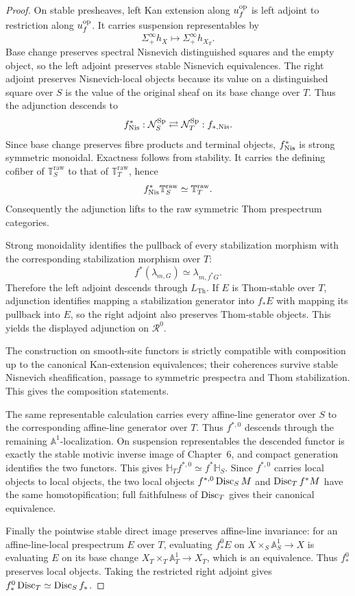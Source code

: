 \begin{proof}
On stable presheaves, left Kan extension along \(u_f^{\mathrm{op}}\) is left adjoint to
restriction along \(u_f^{\mathrm{op}}\).  It carries suspension representables by
\[
  \Sigma^\infty_+h_X
  \longmapsto
  \Sigma^\infty_+h_{X_T}.
\]
Base change preserves spectral Nisnevich distinguished squares and the empty
object, so the left adjoint preserves stable Nisnevich equivalences.  The right
adjoint preserves Nisnevich-local objects because its value on a distinguished
square over \(S\) is the value of the original sheaf on its base change over
\(T\).  Thus the adjunction descends to
\[
  f^*_{\mathrm{Nis}}:\mathcal N_S^{\mathrm{Sp}}
  \rightleftarrows
  \mathcal N_T^{\mathrm{Sp}}:f_{*,\mathrm{Nis}}.
\]
Since base change preserves fibre products and terminal objects,
\(f^*_{\mathrm{Nis}}\) is strong symmetric monoidal.  Exactness follows from stability.
It carries the defining cofiber of \(\mathbb T_S^{\mathrm{raw}}\) to that of
\(\mathbb T_T^{\mathrm{raw}}\), hence
\[
  f^*_{\mathrm{Nis}}\mathbb T_S^{\mathrm{raw}}
  \simeq
  \mathbb T_T^{\mathrm{raw}}.
\]
Consequently the adjunction lifts to the raw symmetric Thom prespectrum
categories.

Strong monoidality identifies the pullback of every stabilization morphism with
the corresponding stabilization morphism over \(T\):
\[
  f^*(\lambda_{m,G})
  \simeq
  \lambda_{m,f^*G}.
\]
Therefore the left adjoint descends through \(L_{\mathrm{Th}}\).  If \(E\) is
Thom-stable over \(T\), adjunction identifies mapping a stabilization generator
into \(f_*E\) with mapping its pullback into \(E\), so the right adjoint also
preserves Thom-stable objects.  This yields the displayed adjunction on
\(\mathcal R^0\).

The construction on smooth-site functors is strictly compatible with
composition up to the canonical Kan-extension equivalences; their coherences
survive stable Nisnevich sheafification, passage to symmetric prespectra and
Thom stabilization.  This gives the composition statements.

The same representable calculation carries every affine-line generator over
\(S\) to the corresponding affine-line generator over \(T\).  Thus
\(f^{*,0}\) descends through the remaining \(\mathbb A^1\)-localization.  On
suspension representables the descended functor is exactly the stable motivic
inverse image of Chapter~6, and compact generation identifies the two functors.
This gives
\(\mathbb H_Tf^{*,0}\simeq f^*\mathbb H_S\).  Since
\(f^{*,0}\) carries local objects to local objects, the two local objects
\(f^{*,0}\operatorname{Disc}_SM\) and \(\operatorname{Disc}_Tf^*M\) have the same homotopification; full
faithfulness of \(\operatorname{Disc}_T\) gives their canonical equivalence.

Finally the pointwise stable direct image preserves affine-line invariance: for
an affine-line-local prespectrum \(E\) over \(T\), evaluating \(f_*^0E\) on
\(X\times_S\mathbb A^1_S\to X\) is evaluating \(E\) on its base change
\(X_T\times_T\mathbb A^1_T\to X_T\), which is an equivalence.  Thus
\(f_*^0\) preserves local objects.  Taking the restricted right adjoint gives
\(f_*^0\operatorname{Disc}_T\simeq\operatorname{Disc}_Sf_*\).
\end{proof}

